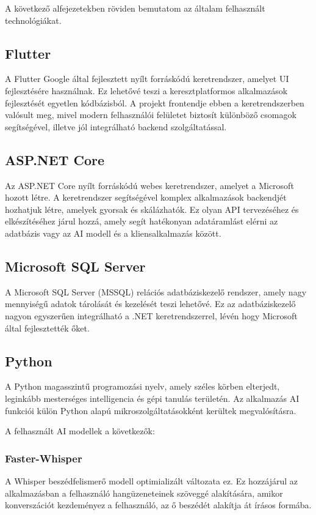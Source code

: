 A következő alfejezetekben röviden bemutatom az általam felhasznált technológiákat.

\subsection{Flutter}

A Flutter Google által fejlesztett nyílt forráskódú keretrendszer, amelyet UI fejlesztésére használnak. Ez lehetővé teszi a keresztplatformos alkalmazások fejlesztését egyetlen kódbázisból. A projekt frontendje ebben a keretrendszerben valósult meg, mivel modern felhasználói felületet biztosít különböző csomagok segítségével, illetve jól integrálható backend szolgáltatással. \cite{flutter}


\subsection{ASP.NET Core}

Az ASP.NET Core nyílt forráskódú webes keretrendszer, amelyet a Microsoft hozott létre. A keretrendszer segítségével komplex alkalmazások backendjét hozhatjuk létre, amelyek gyorsak és skálázhatók. Ez olyan API tervezéséhez és elkészítéséhez járul hozzá, amely segít hatékonyan adatáramlást elérni az adatbázis vagy az AI modell és a kliensalkalmazás között. \cite{aspnetcore}

\subsection{Microsoft SQL Server}

A Microsoft SQL Server (MSSQL) relációs adatbáziskezelő rendszer, amely nagy mennyiségű adatok tárolását és kezelését teszi lehetővé. Ez az adatbáziskezelő nagyon egyszerűen integrálható a .NET keretrendszerrel, lévén hogy Microsoft által fejlesztették őket.\cite{mssql}

\subsection{Python}
A Python magasszintű programozási nyelv, amely széles körben elterjedt, leginkább mesterséges intelligencia és gépi tanulás területén. Az alkalmazás AI funkciói külön Python alapú mikroszolgáltatásokként kerültek megvalósításra. \cite{python}

A felhasznált AI modellek a következők:

\subsubsection{Faster-Whisper}
A Whisper beszédfelismerő modell optimializált változata ez. Ez hozzájárul az alkalmazásban a felhasználó hangüzeneteinek szöveggé alakítására, amikor konverszációt kezdeményez a felhasználó, az ő beszédét alakítja át írásos formába.\cite{fasterwhisper,whisper}

